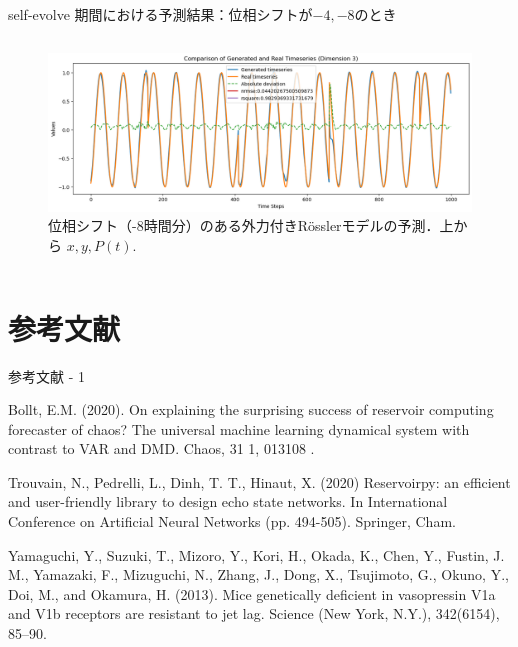 \begin{frame}{self-evolve 期間における予測結果：位相シフトが$-4, -8$のとき}
\begin{columns}[T]
\begin{column}{.5\textwidth}
\begin{figure}
          \vspace{.5em}
          \begin{minipage}[c][.27\textheight][c]{\linewidth}
            \centering
            \includegraphics[width=0.7\linewidth]{Fig/-8.p.png}
            \caption{\scriptsize{位相シフト（-8時間分）のある外力付きRösslerモデルの予測．上から $x, y, P(t)$.}}
          \end{minipage}
        \end{figure}
      \end{column}
    \end{columns}
  \end{frame}
  
  



\section{参考文献}

\begin{frame}{参考文献 - 1}
    \begin{thebibliography}{99}    
        Bollt, E.M. (2020). On explaining the surprising success of reservoir computing forecaster of chaos? The universal machine learning dynamical system with contrast to VAR and DMD. Chaos, 31 1, 013108 .

        Trouvain, N., Pedrelli, L., Dinh, T. T., Hinaut, X. (2020) Reservoirpy: an efficient and user-friendly library to design echo state networks. In International Conference on Artificial Neural Networks (pp. 494-505). Springer, Cham.

        Yamaguchi, Y., Suzuki, T., Mizoro, Y., Kori, H., Okada, K., Chen, Y., Fustin, J. M., Yamazaki, F., Mizuguchi, N., Zhang, J., Dong, X., Tsujimoto, G., Okuno, Y., Doi, M., and Okamura, H. (2013). Mice genetically deficient in vasopressin V1a and V1b receptors are resistant to jet lag. Science (New York, N.Y.), 342(6154), 85–90. 
    \end{thebibliography}
\end{frame}

